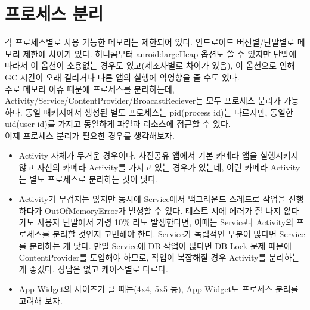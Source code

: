 \begin{comment}
startService 하는 경우가 있는데, 어차피 시작 Activity의 onResume 이후에 실행된다. 따라서 Application에 꼭 넣을 것인지, 시작 Activity에 할 것인지 따져봐야 한다. 왜냐하면 Application.onCreate는 앱이 죽어 있을 때도 BroadcastReceiver, Service, ContentProvider를 다른 앱에서 사용하고자 할 때도 실행하기 때문이다.

restore/full backup일때는 우리가 만든 Application.onCreate를 타지 않는다.

ActivityThread.main
	ActivityThread.attach
	ActivityManagerService.attachApplication
		ActivityManagerService.attacheApplicationLocked
			IApplicationThread.bindApplication
			
\end{comment}

\section{프로세스 분리}
각 프로세스별로 사용 가능한 메모리는 제한되어 있다. 안드로이드 버전별/단말별로 메모리 제한에 차이가 있다.
허니콤부터 anroid:largeHeap 옵션도 쓸 수 있지만 단말에 따라서 이 옵션이 소용없는 경우도 있고(제조사별로 차이가 있음), 이 옵션으로 인해 GC 시간이 오래 걸리거나 다른 앱의 실행에 악영향을 줄 수도 있다.\\ 

주로 메모리 이슈 때문에 프로세스를 분리하는데, Activity/Service/ContentProvider/BroacastReciever는 모두 프로세스 분리가 가능하다.
동일 패키지에서 생성된 별도 프로세스는 pid(process id)는 다르지만, 동일한 uid(user id)를 가지고 동일하게 파일과 리소스에 접근할 수 있다.\\

이제 프로세스 분리가 필요한 경우를 생각해보자.
\begin{itemize}
\item Activity 자체가 무거운 경우이다. 사진공유 앱에서 기본 카메라 앱을 실행시키지 않고 자신의 카메라 Activity를 가지고 있는 경우가 있는데, 이런 카메라 Activity는 별도 프로세스로 분리하는 것이 낫다.
\item Activity가 무겁지는 않지만 동시에 Service에서 백그라운드 스레드로 작업을 진행하다가 OutOfMemoryError가 발생할 수 있다. 테스트 시에 에러가 잘 나지 않다가도 사용자 단말에서 가령 10\% 라도 발생한다면, 이때는 Service나 Activity의 프로세스를 분리할 것인지 고민해야 한다.
Service가 독립적인 부분이 많다면 Service를 분리하는 게 낫다. 만일 Service에 DB 작업이 많다면 DB Lock 문제 때문에 ContentProvider를 도입해야 하므로, 작업이 복잡해질 경우 Activity를 분리하는 게 좋겠다. 정답은 없고 케이스별로 다르다.
\item App Widget의 사이즈가 클 때는(4x4, 5x5 등), App Widget도 프로세스 분리를 고려해 보자.
\end{itemize}

